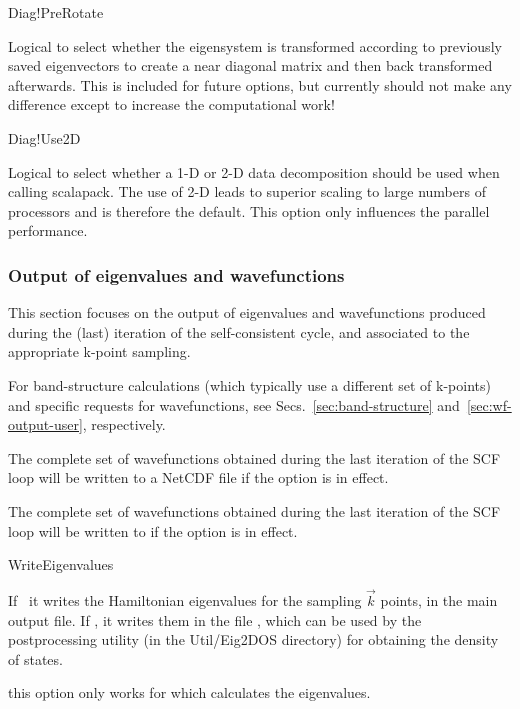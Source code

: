 \begin{fdflogicalF}{Diag!PreRotate}

  Logical to select whether the eigensystem is transformed according
  to previously saved eigenvectors to create a near diagonal matrix
  and then back transformed afterwards. This is included for future
  options, but currently should not make any difference except to
  increase the computational work!
  
\end{fdflogicalF}


\begin{fdflogicalT}{Diag!Use2D}

  Logical to select whether a 1-D or 2-D data decomposition should be
  used when calling scalapack. The use of 2-D leads to superior
  scaling to large numbers of processors and is therefore the
  default. This option only influences the parallel performance.
  
\end{fdflogicalT}


\subsubsection{Output of eigenvalues and wavefunctions}

This section focuses on the output of eigenvalues and wavefunctions
produced during the (last) iteration of the self-consistent cycle,
and associated to the appropriate k-point sampling.

For band-structure calculations (which typically use a different set
of k-points) and specific requests for wavefunctions, see
Secs.~\ref{sec:band-structure} and~\ref{sec:wf-output-user}, respectively.

The complete set of wavefunctions obtained during the last
iteration of the SCF loop will be written to a NetCDF file
 if the  option is in effect.

The complete set of wavefunctions obtained during the last
iteration of the SCF loop will be written to 
if the  option is in effect.


\begin{fdflogicalF}{WriteEigenvalues}

  If \fdftrue\ it writes the Hamiltonian eigenvalues for the sampling
  $\vec k$ points, in the main output file.  If \fdffalse, it
  writes them in the file , which can be used
  by the 
  postprocessing utility (in the Util/Eig2DOS directory) for obtaining
  the density of states.

  \note this option only works for  which
  calculates the eigenvalues.

\end{fdflogicalF}


